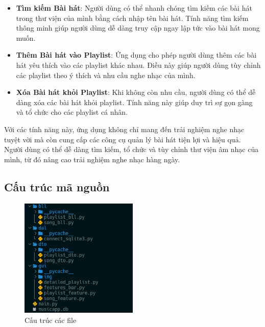 \documentclass[a4paper]{article}
\begin{document}
\begin{itemize}
    \item \textbf{Tìm kiếm Bài hát}: Người dùng có thể nhanh chóng tìm kiếm các bài hát trong thư viện của mình bằng cách nhập tên bài hát. Tính năng tìm kiếm thông minh giúp người dùng dễ dàng truy cập ngay lập tức vào bài hát mong muốn.
    \item \textbf{Thêm Bài hát vào Playlist}: Ứng dụng cho phép người dùng thêm các bài hát yêu thích vào các playlist khác nhau. Điều này giúp người dùng tùy chỉnh các playlist theo ý thích và nhu cầu nghe nhạc của mình.
    \item \textbf{Xóa Bài hát khỏi Playlist}: Khi không còn nhu cầu, người dùng có thể dễ dàng xóa các bài hát khỏi playlist. Tính năng này giúp duy trì sự gọn gàng và tổ chức cho các playlist cá nhân.
\end{itemize}

Với các tính năng này, ứng dụng không chỉ mang đến trải nghiệm nghe nhạc tuyệt vời mà còn cung cấp các công cụ quản lý bài hát tiện lợi và hiệu quả. Người dùng có thể dễ dàng tìm kiếm, tổ chức và tùy chỉnh thư viện âm nhạc của mình, từ đó nâng cao trải nghiệm nghe nhạc hàng ngày.

\subsection{Cấu trúc mã nguồn}
\begin{figure}[H]
    \centering
    \includegraphics[width=0.5\textwidth]{file_structure.PNG}
    \caption{Cấu trúc các file}
    \label{fig:example_image}
\end{figure}
\end{document}
